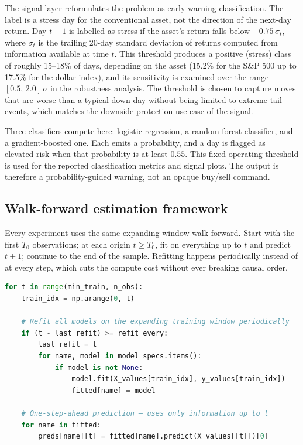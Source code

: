 The signal layer reformulates the problem as early-warning classification. The label is a stress day for the conventional asset, not the direction of the next-day return. Day $t+1$ is labelled as stress if the asset's return falls below $-0.75\,\sigma_t$, where $\sigma_t$ is the trailing 20-day standard deviation of returns computed from information available at time $t$. This threshold produces a positive (stress) class of roughly 15--18\% of days, depending on the asset (15.2\% for the S\&P 500 up to 17.5\% for the dollar index), and its sensitivity is examined over the range $[0.5,\,2.0]\,\sigma$ in the robustness analysis. The threshold is chosen to capture moves that are worse than a typical down day without being limited to extreme tail events, which matches the downside-protection use case of the signal.

Three classifiers compete here: logistic regression, a random-forest classifier, and a gradient-boosted one. Each emits a probability, and a day is flagged as elevated-risk when that probability is at least $0.55$. This fixed operating threshold is used for the reported classification metrics and signal plots. The output is therefore a probability-guided warning, not an opaque buy/sell command.

\subsection{Walk-forward estimation framework}

Every experiment uses the same expanding-window walk-forward. Start with the first $T_0$ observations; at each origin $t \geq T_0$, fit on everything up to $t$ and predict $t+1$; continue to the end of the sample. Refitting happens periodically instead of at every step, which cuts the compute cost without ever breaking causal order.

\begin{lstlisting}[language=Python, caption={Expanding-window walk-forward loop (\texttt{pipeline.py}).}, label=lst:walkforward]
for t in range(min_train, n_obs):
    train_idx = np.arange(0, t)

    # Refit all models on the expanding training window periodically
    if (t - last_refit) >= refit_every:
        last_refit = t
        for name, model in model_specs.items():
            if model is not None:
                model.fit(X_values[train_idx], y_values[train_idx])
                fitted[name] = model

    # One-step-ahead prediction — uses only information up to t
    for name in fitted:
        preds[name][t] = fitted[name].predict(X_values[[t]])[0]
\end{lstlisting}

